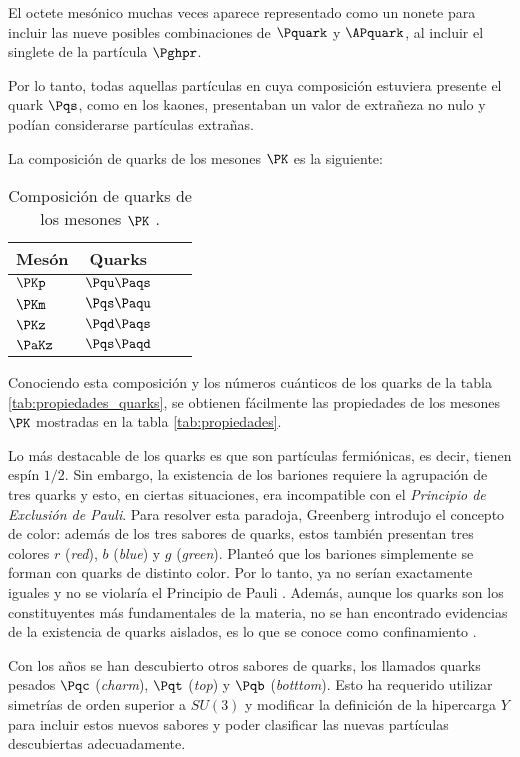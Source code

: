 El octete mesónico muchas veces aparece representado como un nonete para incluir las nueve posibles combinaciones de $\Pquark$ y $\APquark$, al incluir el singlete de la partícula $\Pghpr$.

Por lo tanto, todas aquellas partículas en cuya composición estuviera presente el quark $\Pqs$, como en los kaones, presentaban un valor de extrañeza no nulo y podían considerarse partículas extrañas. 

La composición de quarks de los mesones $\PK$ es la siguiente:

\begin{table}[h!]
	\centering
	\begin{tabular}{l*{2}{c}r}
\hline
Mesón & Quarks\\ 
\hline
$\PKp$ & $\Pqu\Paqs$\\
$\PKm$ & $\Pqs\Paqu$\\
$\PKz$ & $\Pqd\Paqs$\\
$\PaKz$ & $\Pqs\Paqd$\\
\hline
	\end{tabular}
\caption[Composición de quarks de los mesones $\PK$]{Composición de quarks de los mesones $\PK$ \cite{notas2020}.} 
\label{tab:mesonesK_quarks}
\end{table}

Conociendo esta composición y los números cuánticos de los quarks de la tabla \ref{tab:propiedades_quarks}, se obtienen fácilmente las propiedades de los mesones $\PK$ mostradas en la tabla \ref{tab:propiedades}.

Lo más destacable de los quarks es que son partículas fermiónicas, es decir, tienen espín $1/2$. Sin embargo, la existencia de los bariones requiere la agrupación de tres quarks y esto, en ciertas situaciones, era incompatible con el \textit{Principio de Exclusión de Pauli}. Para resolver esta paradoja, Greenberg introdujo el concepto de color: además de los tres sabores de quarks, estos también presentan tres colores $r$ (\textit{red}), $b$ (\textit{blue}) y $g$ (\textit{green}). Planteó que los bariones simplemente se forman con quarks de distinto color. Por lo tanto, ya no serían exactamente iguales y no se violaría el Principio de Pauli \cite{Griffiths2008}. Además, aunque los quarks son los constituyentes más fundamentales de la materia, no se han encontrado evidencias de la existencia de quarks aislados, es lo que se conoce como confinamiento \cite{Pais}.

Con los años se han descubierto otros sabores de quarks, los llamados quarks pesados $\Pqc$ (\textit{charm}), $\Pqt$ (\textit{top}) y $\Pqb$ (\textit{botttom}). Esto ha requerido utilizar simetrías de orden superior a $SU(3)$ y modificar la definición de la hipercarga $Y$ para incluir estos nuevos sabores y poder clasificar las nuevas partículas descubiertas adecuadamente.

